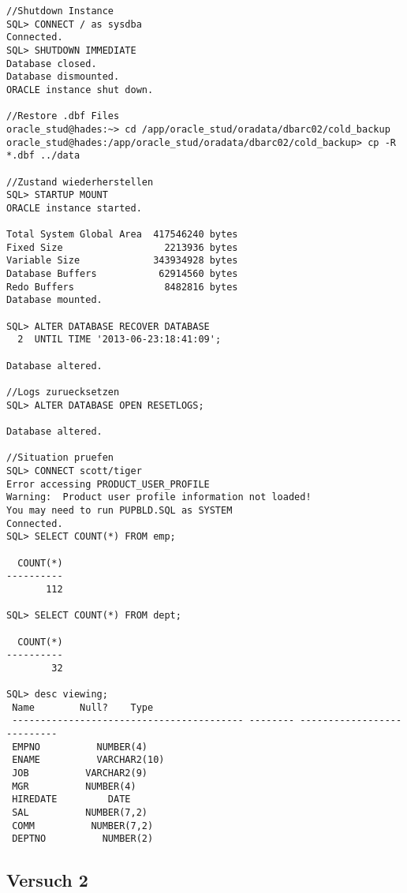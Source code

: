 \documentclass[11pt,a4paper,parskip=half]{scrartcl}
\begin{document}
\begin{lstlisting}
//Shutdown Instance
SQL> CONNECT / as sysdba
Connected.
SQL> SHUTDOWN IMMEDIATE
Database closed.
Database dismounted.
ORACLE instance shut down.

//Restore .dbf Files
oracle_stud@hades:~> cd /app/oracle_stud/oradata/dbarc02/cold_backup
oracle_stud@hades:/app/oracle_stud/oradata/dbarc02/cold_backup> cp -R *.dbf ../data

//Zustand wiederherstellen
SQL> STARTUP MOUNT
ORACLE instance started.

Total System Global Area  417546240 bytes
Fixed Size                  2213936 bytes
Variable Size             343934928 bytes
Database Buffers           62914560 bytes
Redo Buffers                8482816 bytes
Database mounted.

SQL> ALTER DATABASE RECOVER DATABASE
  2  UNTIL TIME '2013-06-23:18:41:09';

Database altered.

//Logs zuruecksetzen
SQL> ALTER DATABASE OPEN RESETLOGS;

Database altered.

//Situation pruefen
SQL> CONNECT scott/tiger
Error accessing PRODUCT_USER_PROFILE
Warning:  Product user profile information not loaded!
You may need to run PUPBLD.SQL as SYSTEM
Connected.
SQL> SELECT COUNT(*) FROM emp;

  COUNT(*)
----------
       112

SQL> SELECT COUNT(*) FROM dept;

  COUNT(*)
----------
        32

SQL> desc viewing;
 Name        Null?    Type
 ----------------------------------------- -------- ---------------------------
 EMPNO          NUMBER(4)
 ENAME          VARCHAR2(10)
 JOB          VARCHAR2(9)
 MGR          NUMBER(4)
 HIREDATE         DATE
 SAL          NUMBER(7,2)
 COMM          NUMBER(7,2)
 DEPTNO          NUMBER(2)
\end{lstlisting}

\subsection{Versuch 2}
\end{document}
